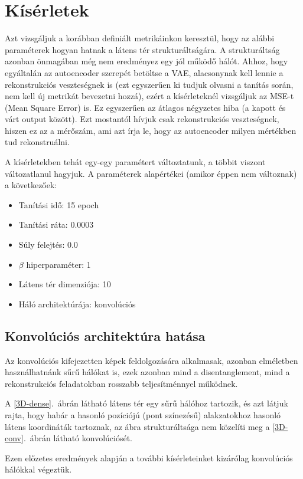 \section{Kísérletek}

Azt vizsgáljuk a korábban definiált metrikáinkon keresztül, hogy az alábbi paraméterek hogyan hatnak a látens tér strukturáltságára. A strukturáltság azonban önmagában még nem eredményez egy jól működő hálót. Ahhoz, hogy egyáltalán az autoencoder szerepét betöltse a VAE, alacsonynak kell lennie a rekonstrukciós veszteségnek is (ezt egyszerűen ki tudjuk olvasni a tanítás során, nem kell új metrikát bevezetni hozzá), ezért a kísérleteknél vizsgáljuk az MSE-t (Mean Square Error) is. Ez egyszerűen az átlagos négyzetes hiba (a kapott és várt output között). Ezt mostantól hívjuk csak rekonstrukciós veszteségnek, hiszen ez az a mérőszám, ami azt írja le, hogy az autoencoder milyen mértékben tud rekonstruálni.

A kísérletekben tehát egy-egy paramétert változtatunk, a többit viszont változatlanul hagyjuk. A paraméterek alapértékei (amikor éppen nem változnak) a következőek:

\begin{itemize}
  \item Tanítási idő: 15 epoch
  \item Tanítási ráta: 0.0003
  \item Súly felejtés: 0.0
  \item $\beta$ hiperparaméter: 1
  \item Látens tér dimenziója: 10
  \item Háló architektúrája: konvolúciós
\end{itemize}

\subsection{Konvolúciós architektúra hatása}

Az  konvolúciós kifejezetten képek feldolgozására alkalmasak, azonban elméletben használhatnánk sűrű hálókat is, ezek azonban mind a disentanglement, mind a rekonstrukciós feladatokban rosszabb teljesítménnyel működnek. 

A \ref{3D-dense}.~ábrán látható látens tér egy sűrű hálóhoz tartozik, és azt látjuk rajta, hogy habár a hasonló pozíciójú (pont színezésű) alakzatokhoz hasonló látens koordináták tartoznak, az ábra strukturáltsága nem közelíti meg a \ref{3D-conv}.~ábrán látható konvolúciósét.

Ezen előzetes eredmények alapján a további kísérleteinket kizárólag konvolúciós hálókkal végeztük.

